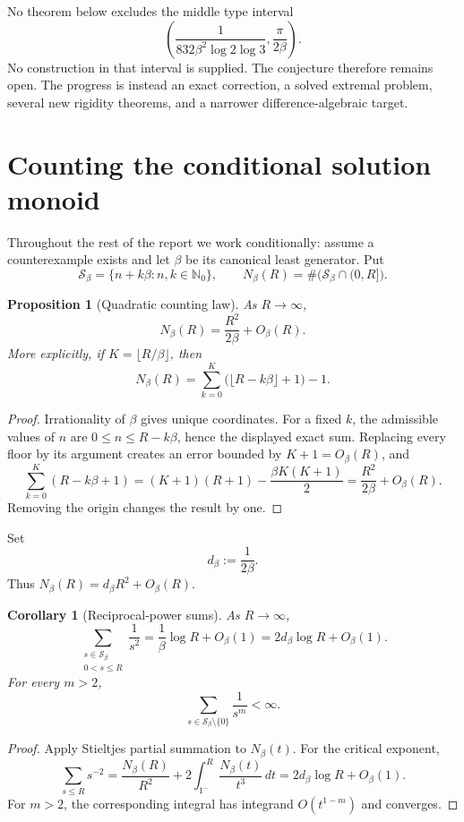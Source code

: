 \documentclass[11pt,oneside]{article}
\newtheorem{proposition}[theorem]{Proposition}
\newtheorem{corollary}[theorem]{Corollary}
\theoremstyle{definition}
\theoremstyle{remark}
\newcommand{\Nzero}{\mathbb N_0}
\newcommand{\Sbeta}{\mathcal S_\beta}
\begin{document}
No theorem below excludes the middle type interval
\[
 \left(\frac{1}{832\beta^2\log2\log3},\frac{\pi}{2\beta}\right).
\]
No construction in that interval is supplied.  The conjecture therefore remains open.  The
progress is instead an exact correction, a solved extremal problem, several new rigidity
theorems, and a narrower difference-algebraic target.

\section{Counting the conditional solution monoid}
\label{sec:counting}

Throughout the rest of the report we work conditionally: assume a counterexample exists and
let $\beta$ be its canonical least generator.  Put
\[
 \Sbeta=\{n+k\beta:n,k\in\Nzero\},
 \qquad
 N_\beta(R)=\#\bigl(\Sbeta\cap(0,R]\bigr).
\]

\begin{proposition}[Quadratic counting law]
\label{prop:counting}
As $R\to\infty$,
\[
 N_\beta(R)=\frac{R^2}{2\beta}+O_\beta(R).
\]
More explicitly, if $K=\lfloor R/\beta\rfloor$, then
\[
 N_\beta(R)=
 \sum_{k=0}^{K}\bigl(\lfloor R-k\beta\rfloor+1\bigr)-1.
\]
\end{proposition}

\begin{proof}
Irrationality of $\beta$ gives unique coordinates.  For a fixed $k$, the admissible values
of $n$ are $0\le n\le R-k\beta$, hence the displayed exact sum.  Replacing every floor by
its argument creates an error bounded by $K+1=O_\beta(R)$, and
\[
 \sum_{k=0}^{K}(R-k\beta+1)
 =(K+1)(R+1)-\frac{\beta K(K+1)}2
 =\frac{R^2}{2\beta}+O_\beta(R).
\]
Removing the origin changes the result by one.
\end{proof}

Set
\[
 d_\beta:=\frac1{2\beta}.
\]
Thus $N_\beta(R)=d_\beta R^2+O_\beta(R)$.

\begin{corollary}[Reciprocal-power sums]
\label{cor:reciprocal}
As $R\to\infty$,
\[
 \sum_{\substack{s\in\Sbeta\\0<s\le R}}\frac1{s^2}
 =\frac1\beta\log R+O_\beta(1)
 =2d_\beta\log R+O_\beta(1).
\]
For every $m>2$,
\[
 \sum_{s\in\Sbeta\setminus\{0\}}\frac1{s^m}<\infty.
\]
\end{corollary}

\begin{proof}
Apply Stieltjes partial summation to $N_\beta(t)$.  For the critical exponent,
\[
 \sum_{s\le R}s^{-2}
 =\frac{N_\beta(R)}{R^2}+2\int_{1^-}^{R}\frac{N_\beta(t)}{t^3}\,dt
 =2d_\beta\log R+O_\beta(1).
\]
For $m>2$, the corresponding integral has integrand $O(t^{1-m})$ and converges.
\end{proof}
\end{document}
